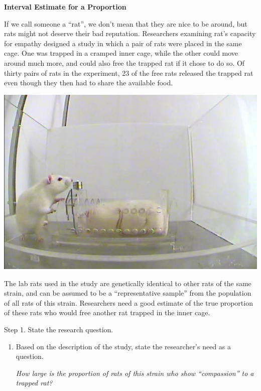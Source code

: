 
\def\theTopic{Interval Estimate }
\def\dayNum{6}

\begin{center}
\vspace*{-.2in}
{\bf {\large Interval Estimate for a Proportion}}\\
\end{center}


If we call someone a ``rat'', we don't mean that they are nice to be
around, but rats might not deserve their bad reputation. Researchers
examining rat's capacity for empathy designed a study in which a pair
of rats were placed in the same cage.  One was trapped in a cramped
inner cage, while the other could move around much more, and could
also free the trapped rat if it chose to do so.  Of thirty pairs of
rats in the experiment, 23 of the free rats released the trapped
rat even though they then had to share the available food.


\begin{center}
  \includegraphics[width=.4\linewidth]{../plots/trappedRat.png}
\end{center}

The lab rats  used in the study are genetically identical to other
rats of the same strain, and can be assumed to be a ``representative
sample'' from the population of all rats of this strain.  Researchers
need a good estimate of the true proportion of these rats who would
free another rat trapped in the inner cage.

{\sf Step 1. State the research question.}\vspace{-.1in}
\begin{enumerate}
  \item Based on the description of the study, state the researcher's
   need as a question. 
\begin{students}
  \vspace{1cm}
\end{students}

\begin{key}
{\it How large is the proportion of rats of this strain who show
  ``compassion'' to a trapped rat?}
\end{key}

\end{enumerate}


